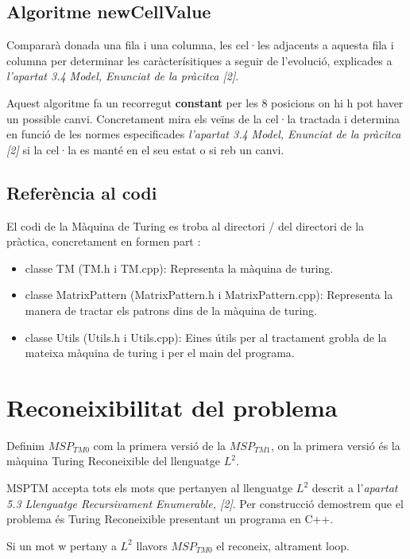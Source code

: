 \documentclass[12pt,a4paper]{report}
\def \tmz{$MSP_{TM0} $}
\def \tmu{$MSP_{TM1} $}
\def \ld{$L^{2}$}
\begin{document}
\subsection{Algoritme newCellValue}

Compararà donada una fila i una columna, les cel·les adjacents a aquesta fila i columna per determinar les caràcterísitiques a seguir de l’evolució, explicades a \textit{l’apartat 3.4 Model, Enunciat de la pràcitca [2]}.

Aquest algoritme fa un recorregut \textbf{constant} per les 8 posicions on hi h pot haver un possible canvi. Concretament mira els veïns de la cel·la tractada i determina en funció de les normes especificades \textit{l’apartat 3.4 Model, Enunciat de la pràcitca [2]} si la cel·la es manté en el seu estat o si reb un canvi. 

\subsection{Referència al codi}

El codi de la Màquina de Turing es troba al directori / del directori de la pràctica, concretament en formen part : 

\begin{itemize}
\item classe TM (TM.h i TM.cpp): Representa la màquina de turing. 
\item classe MatrixPattern (MatrixPattern.h i MatrixPattern.cpp): Representa la manera de tractar els patrons dins de la màquina de turing.
\item classe Utils  (Utils.h i Utils.cpp): Eines útils per al tractament grobla de la mateixa màquina de turing i per el main del programa.
\end{itemize}

\section{Reconeixibilitat del problema}

Definim \tmz{} com la primera versió de la \tmu{}, on la primera versió és la màquina Turing Reconeixible del llenguatge \ld{}. 

MSPTM accepta tots els mots que pertanyen al llenguatge \ld{} descrit a l’\textit{apartat 5.3 Llenguatge Recursivament Enumerable, [2]}. Per construcció demostrem que el problema és Turing Reconeixible presentant un programa en C++. 

Si un mot w pertany a \ld{} llavors \tmz{} el reconeix, altrament loop. 
\end{document}

